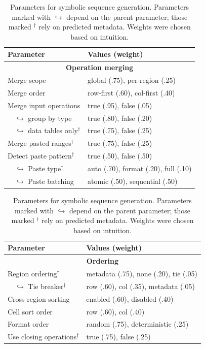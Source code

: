 \documentclass{article}
\theoremstyle{plain}
\theoremstyle{definition}
\theoremstyle{remark}
\begin{document}
\begin{table}[t]
    \centering
    \small
    \begin{minipage}[t]{0.49\textwidth}
    \centering
    \begin{tabularx}{\textwidth}{lX}
    \toprule
    \textbf{Parameter} & \textbf{Values (weight)} \\
    \midrule
    \multicolumn{2}{c}{\bfseries Operation merging} \\
    \midrule
    Merge scope                  & global (.75), per-region (.25) \\
    Merge order                  & row-first (.60), col-first (.40) \\
    Merge input operations       & true (.95), false (.05) \\
    $\quad\hookrightarrow$ group by type        & true (.80), false (.20) \\
    $\quad\hookrightarrow$ data tables only$^\dag$ & true (.75), false (.25) \\
    Merge pasted ranges$^\dag$   & true (.75), false (.25) \\
    Detect paste pattern$^\dag$  & true (.50), false (.50) \\
    $\quad\hookrightarrow$ Paste type$^\dag$    & auto (.70), format (.20), full (.10) \\
    $\quad\hookrightarrow$ Paste batching       & atomic (.50), sequential (.50) \\
    \bottomrule
    \end{tabularx}
    \end{minipage}\hfill
    \begin{minipage}[t]{0.49\textwidth}
    \centering
    \begin{tabularx}{\textwidth}{lX}
    \toprule
    \textbf{Parameter} & \textbf{Values (weight)} \\
    \midrule
    \multicolumn{2}{c}{\bfseries Ordering} \\
    \midrule
    Region ordering$^\dag$       & metadata (.75), none (.20), tie (.05) \\
    $\quad\hookrightarrow$ Tie breaker$^\dag$   & row (.60), col (.35), metadata (.05) \\
    Cross-region sorting         & enabled (.60), disabled (.40) \\
    Cell sort order              & row (.60), col (.40) \\
    Format order                 & random (.75), deterministic (.25) \\
    Use closing operations$^\dag$ & true (.75), false (.25) \\
    \bottomrule
    \end{tabularx}
    \end{minipage}
    \caption{Parameters for symbolic sequence generation. Parameters marked
    with $\hookrightarrow$ depend on the parent parameter; those marked
    $^\dag$ rely on predicted metadata. Weights were chosen based on
    intuition.}
    \label{tab:symbolicparameters}
\end{table}
\end{document}
